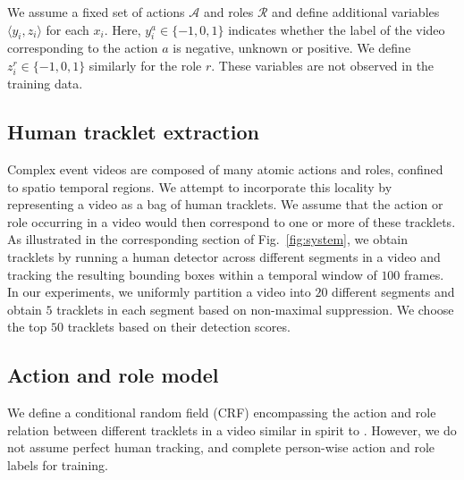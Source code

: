 \documentclass[10pt,twocolumn,letterpaper]{article}
\begin{document}
We assume a fixed set of actions $\mathcal{A}$ and roles $\mathcal{R}$ and define additional variables $\langle y_i, z_i \rangle$ for each $x_i$. 
Here, $y_i^a \in \{-1,0,1\}$ indicates whether the label of the video corresponding
to the action $a$ is negative, unknown or positive. We define $z_i^r \in \{-1,0,1\}$ similarly for the role $r$. 
These variables are not observed in the training data.


\subsection{Human tracklet extraction}
Complex event videos are composed of many atomic actions and roles, 
confined to spatio temporal regions. 
We attempt to incorporate this locality by representing a video as a bag of human tracklets. 
We assume that the action or role occurring in a video would then correspond to one or more of these tracklets. 
As illustrated in the corresponding section of Fig.~\ref{fig:system}, 
we obtain tracklets by running a human detector \cite{Felzenszwalb_PAMI10} across different segments in a video 
and tracking the resulting bounding boxes within a temporal window of $100$ frames. 
In our experiments, we uniformly partition a video into $20$ different segments and obtain $5$ tracklets in each segment 
based on non-maximal suppression. We choose the top $50$ tracklets based on their detection scores.

\subsection{Action and role model}\label{sec:model_features}
We define a conditional random field (CRF) encompassing the action and role relation between different tracklets
in a video similar in spirit to \cite{Lan_CVPR12}. 
However, we do not assume perfect human tracking, 
and complete person-wise action and role labels for training. 
\end{document}
